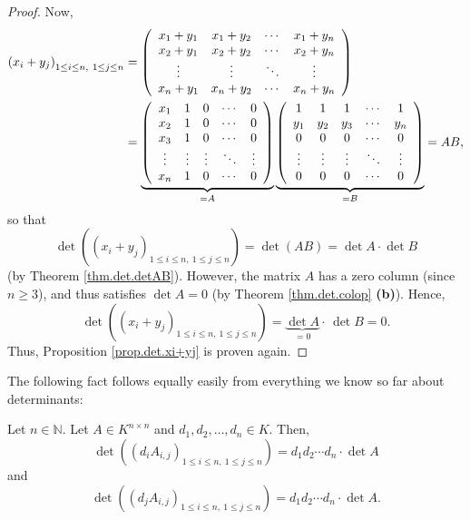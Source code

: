 \begin{proof}
Now,
\begin{align*}
\left(  x_{i}+y_{j}\right)  _{1\leq i\leq n,\ 1\leq j\leq n}  &  =\left(
\begin{array}
[c]{cccc}%
x_{1}+y_{1} & x_{1}+y_{2} & \cdots & x_{1}+y_{n}\\
x_{2}+y_{1} & x_{2}+y_{2} & \cdots & x_{2}+y_{n}\\
\vdots & \vdots & \ddots & \vdots\\
x_{n}+y_{1} & x_{n}+y_{2} & \cdots & x_{n}+y_{n}%
\end{array}
\right) \\
&  =\underbrace{\left(
\begin{array}
[c]{ccccc}%
x_{1} & 1 & 0 & \cdots & 0\\
x_{2} & 1 & 0 & \cdots & 0\\
x_{3} & 1 & 0 & \cdots & 0\\
\vdots & \vdots & \vdots & \ddots & \vdots\\
x_{n} & 1 & 0 & \cdots & 0
\end{array}
\right)  }_{=A}\underbrace{\left(
\begin{array}
[c]{ccccc}%
1 & 1 & 1 & \cdots & 1\\
y_{1} & y_{2} & y_{3} & \cdots & y_{n}\\
0 & 0 & 0 & \cdots & 0\\
\vdots & \vdots & \vdots & \ddots & \vdots\\
0 & 0 & 0 & \cdots & 0
\end{array}
\right)  }_{=B}=AB,
\end{align*}
so that%
\[
\det\left(  \left(  x_{i}+y_{j}\right)  _{1\leq i\leq n,\ 1\leq j\leq
n}\right)  =\det\left(  AB\right)  =\det A\cdot\det B
\]
(by Theorem \ref{thm.det.detAB}). However, the matrix $A$ has a zero column
(since $n\geq3$), and thus satisfies $\det A=0$ (by Theorem
\ref{thm.det.colop} \textbf{(b)}). Hence,%
\[
\det\left(  \left(  x_{i}+y_{j}\right)  _{1\leq i\leq n,\ 1\leq j\leq
n}\right)  =\underbrace{\det A}_{=0}\cdot\,\det B=0.
\]
Thus, Proposition \ref{prop.det.xi+yj} is proven again.
\end{proof}

The following fact follows equally easily from everything we know so far about determinants:

\begin{corollary}
\label{cor.det.scale-row-col}Let $n\in\mathbb{N}$. Let $A\in K^{n\times n}$
and $d_{1},d_{2},\ldots,d_{n}\in K$. Then,%
\begin{equation}
\det\left(  \left(  d_{i}A_{i,j}\right)  _{1\leq i\leq n,\ 1\leq j\leq
n}\right)  =d_{1}d_{2}\cdots d_{n}\cdot\det A
\label{eq.cor.det.scale-row-col.row}%
\end{equation}
and%
\begin{equation}
\det\left(  \left(  d_{j}A_{i,j}\right)  _{1\leq i\leq n,\ 1\leq j\leq
n}\right)  =d_{1}d_{2}\cdots d_{n}\cdot\det A.
\label{eq.cor.det.scale-row-col.col}%
\end{equation}

\end{corollary}


